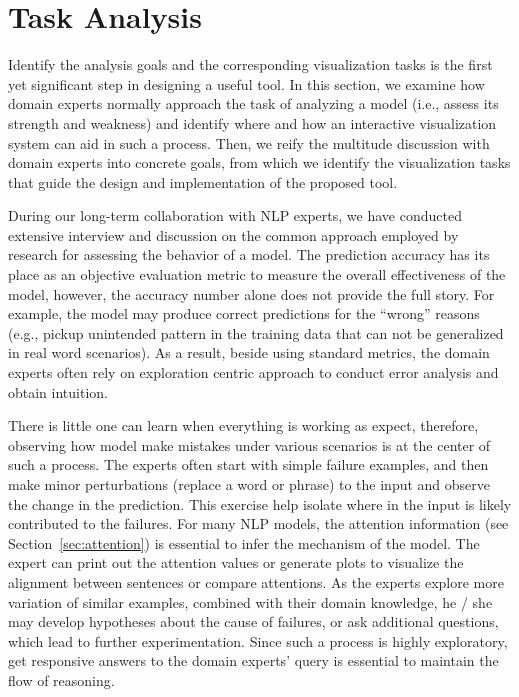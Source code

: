\section{Task Analysis}
\label{sec:task}
Identify the analysis goals and the corresponding visualization tasks is the first yet significant step in designing a useful tool. In this section, we examine how domain experts normally approach the task of analyzing a model (i.e., assess its strength and weakness) and identify where and how an interactive visualization system can aid in such a process.
Then, we reify the multitude discussion with domain experts into concrete goals, from which we identify the visualization tasks that guide the design and implementation of the proposed tool.

During our long-term collaboration with NLP experts, we have conducted extensive interview and discussion on the common approach employed by research for assessing the behavior of a model.%
The prediction accuracy has its place as an objective evaluation metric to measure the overall effectiveness of the model, however, the accuracy number alone does not provide the full story. 
For example, the model may produce correct predictions for the ``wrong'' reasons (e.g., pickup unintended pattern in the training data that can not be generalized in real word scenarios).
%
As a result, beside using standard metrics, the domain experts often rely on exploration centric approach to 
conduct error analysis and obtain intuition.

There is little one can learn when everything is working as expect, therefore, observing how model make mistakes under various scenarios is at the center of such a process. 
The experts often start with simple failure examples, and then make minor perturbations (replace a word or phrase) to the input and observe the change in the prediction. This exercise help isolate where in the input is likely contributed to the failures. For many NLP models, the attention information (see Section~\ref{sec:attention}) is essential to infer the mechanism of the model. The expert can print out the attention values or generate plots to visualize the alignment between sentences or compare attentions. As the experts explore more variation of similar examples, combined with their domain knowledge, he / she may develop hypotheses about the cause of failures, or ask additional questions, which lead to further experimentation.
%
Since such a process is highly exploratory, get responsive answers to the domain experts' query is essential to maintain the flow of reasoning.

